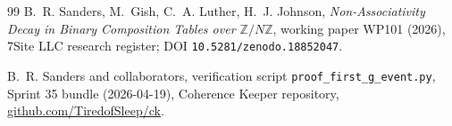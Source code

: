 \documentclass[11pt,reqno]{amsart}
\theoremstyle{definition}
\newcommand{\Z}{\mathbb{Z}}
\begin{document}
\begin{thebibliography}{99}
B.~R. Sanders, M.~Gish, C.~A. Luther, H.~J. Johnson, \emph{Non-Associativity
Decay in Binary Composition Tables over $\Z/N\Z$}, working paper WP101
(2026), 7Site LLC research register; DOI \texttt{10.5281/zenodo.18852047}.

B.~R. Sanders and collaborators, verification script
\texttt{proof\_first\_g\_event.py}, Sprint 35 bundle
(2026-04-19), Coherence Keeper repository,
\href{https://github.com/TiredofSleep/ck}{github.com/TiredofSleep/ck}.

\end{thebibliography}
\end{document}
